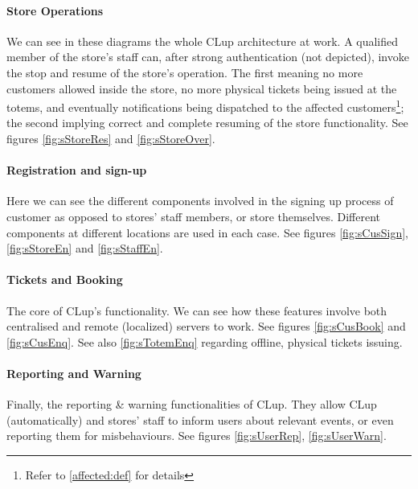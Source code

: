 

\paragraph{Store Operations}
We can see in these diagrams the whole CLup architecture at work. A qualified member of the store's staff can, after strong authentication (not depicted), invoke the stop and resume of the store's operation. The first meaning no more customers allowed inside the store, no more physical tickets being issued at the totems, and eventually notifications being dispatched to the affected customers\footnote{Refer to \ref{affected:def} \space for details}; the second implying correct and complete resuming of the store functionality. See figures \ref{fig:sStoreRes} and \ref{fig:sStoreOver}.

\paragraph{Registration and sign-up }
Here we can see the different components involved in the signing up process of customer as opposed to stores' staff members, or store themselves. Different components at different locations are used in each case. See figures \ref{fig:sCusSign}, \ref{fig:sStoreEn} and \ref{fig:sStaffEn}.

\paragraph{Tickets and Booking}
The core of CLup's functionality. We can see how these features involve both centralised and remote (localized) servers to work. See figures \ref{fig:sCusBook} \space and \ref{fig:sCusEnq}. \newline
See also \ref{fig:sTotemEnq} regarding offline, physical tickets issuing.

\paragraph{Reporting and Warning}
Finally, the reporting \& warning functionalities of CLup. They allow CLup (automatically) and stores' staff to inform users about relevant events, or even reporting them for misbehaviours. See figures \ref{fig:sUserRep}, \ref{fig:sUserWarn}.

